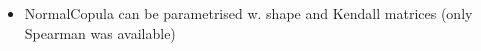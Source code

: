 \documentclass[aspectratio=169]{beamer}
\begin{document}
\begin{frame}
\begin{center}
   \end{center}
   \begin{itemize}
   \item NormalCopula can be parametrised w. shape and Kendall matrices (only Spearman was available)
   \end{itemize}


%
\end{frame}

\end{document}
